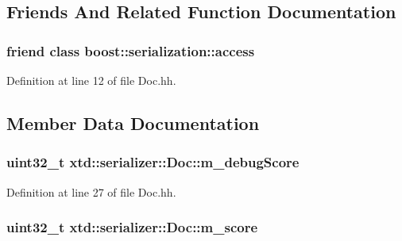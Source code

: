 \subsection{Friends And Related Function Documentation}
\subsubsection[{\texorpdfstring{boost\+::serialization\+::access}{boost::serialization::access}}]{\setlength{\rightskip}{0pt plus 5cm}friend class boost\+::serialization\+::access\hspace{0.3cm}{\ttfamily [friend]}}\hypertarget{classxtd_1_1serializer_1_1Doc_ac98d07dd8f7b70e16ccb9a01abf56b9c}{}\label{classxtd_1_1serializer_1_1Doc_ac98d07dd8f7b70e16ccb9a01abf56b9c}


Definition at line 12 of file Doc.\+hh.



\subsection{Member Data Documentation}
\subsubsection[{\texorpdfstring{m\+\_\+debug\+Score}{m_debugScore}}]{\setlength{\rightskip}{0pt plus 5cm}uint32\+\_\+t xtd\+::serializer\+::\+Doc\+::m\+\_\+debug\+Score}\hypertarget{classxtd_1_1serializer_1_1Doc_ae35b707444a257c668b6cc8dfb2d63e4}{}\label{classxtd_1_1serializer_1_1Doc_ae35b707444a257c668b6cc8dfb2d63e4}


Definition at line 27 of file Doc.\+hh.

\subsubsection[{\texorpdfstring{m\+\_\+score}{m_score}}]{\setlength{\rightskip}{0pt plus 5cm}uint32\+\_\+t xtd\+::serializer\+::\+Doc\+::m\+\_\+score}\hypertarget{classxtd_1_1serializer_1_1Doc_ac6e0a47819dac6373483fb0dd5ad91d0}{}\label{classxtd_1_1serializer_1_1Doc_ac6e0a47819dac6373483fb0dd5ad91d0}


